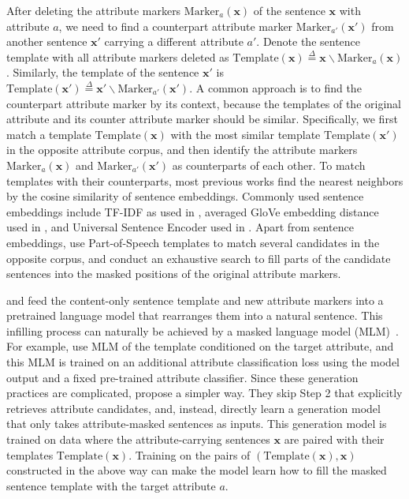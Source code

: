 \label{sec:tar_attr_retr}
After deleting the attribute markers $\mathrm{Marker}_a(\bm{x})$ of the sentence $\bm{x}$ with attribute $a$, we need to find a counterpart attribute marker $\mathrm{Marker}_{a'}(\bm{x}')$ from another sentence $\bm{x}'$ carrying a different attribute ${a}'$. Denote the sentence template with all attribute markers deleted as $\mathrm{Template}(\bm{x}) \overset{\Delta}{=} \bm{x} \backslash \mathrm{Marker}_a(\bm{x})$. Similarly, the template of the sentence $\bm{x}'$ is $\mathrm{Template}(\bm{x}') \overset{\Delta}{=} \bm{x}' \backslash \mathrm{Marker}_{a'}(\bm{x}')$.
A common approach is to find the counterpart attribute marker by its context, because the templates of the original attribute and its counter attribute marker should be similar. Specifically, we first match a template $\mathrm{Template}(\bm{x})$ with the most similar template $\mathrm{Template}(\bm{x}')$ in the opposite attribute corpus, and then identify the attribute markers $\mathrm{Marker}_a(\bm{x})$ and $\mathrm{Marker}_{a'}(\bm{x}')$ as counterparts of each other.
To match templates with their counterparts, most previous works find the nearest neighbors by the cosine similarity of sentence embeddings. Commonly used sentence embeddings include TF-IDF as used in , averaged GloVe embedding distance used in , and Universal Sentence Encoder  used in . Apart from sentence embeddings,  use Part-of-Speech templates to match several candidates in the opposite corpus, and conduct an exhaustive search to fill parts of the candidate sentences into the masked positions of the original attribute markers.

\label{sec:gen_from_proto}
 and  feed the content-only sentence template and new attribute markers into a pretrained language model that rearranges them into a natural sentence.
This infilling process can naturally be achieved by a masked language model (MLM)~. For example,  use MLM of the template conditioned on the target attribute, and this MLM is trained on an additional attribute classification loss using the model output and a fixed pre-trained attribute classifier.
Since these generation practices are complicated,
 propose a simpler way. They skip Step 2 that explicitly retrieves attribute candidates, and, instead, directly learn a generation model that only takes attribute-masked sentences as inputs. This generation model is trained on data where the attribute-carrying sentences $\bm{x}$ are paired with their templates $\mathrm{Template}(\bm{x})$.
Training on the pairs of $( \mathrm{Template}(\bm{x}), \bm{x})$ constructed in the above way can make the model learn how to fill the masked sentence template with the target attribute $a$.

